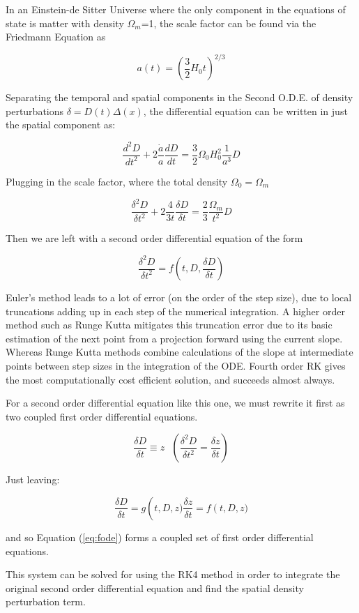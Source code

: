 


In an Einstein-de Sitter Universe where the only component in the equations of state is matter with density $\Omega_m$=1, the scale factor can be found via the Friedmann Equation as

\begin{equation}
  a(t) = \left(\frac{3}{2}H_0t\right)^{2/3}
\end{equation}

Separating the temporal and spatial components in the Second O.D.E. of density perturbations $\delta = D(t)\Delta(x)$, the differential equation can be written in just the spatial component as:

\begin{equation}
  \frac{d^2D}{dt^2}+2\frac{\dot{a}}{a}\frac{dD}{dt}=\frac{3}{2}\Omega_0H_0^2\frac{1}{a^3}D
\end{equation}

Plugging in the scale factor, where the total density $\Omega_0 = \Omega_m$

\begin{equation}
  \frac{\delta^2D}{\delta t^2}+2\frac{4}{3t}\frac{\delta D}{\delta t}=\frac{2}{3}\frac{\Omega_m}{t^2}D
\end{equation}

Then we are left with a second order differential equation of the form

\begin{equation}
  \frac{\delta^2D}{\delta t^2}=f\left(t,D,\frac{\delta D}{\delta t}\right)
\end{equation}

Euler's method leads to a lot of error (on the order of the step size),  due to local truncations adding up in each step of the numerical integration. A higher order method such as Runge Kutta mitigates this truncation error due to its basic estimation of the next point from a projection forward using the current slope. Whereas Runge Kutta methods combine calculations of the slope at intermediate points between step sizes in the integration of the ODE. Fourth order RK gives the most computationally cost efficient solution, and succeeds almost always.

For a second order differential equation like this one, we must rewrite it first as two coupled first order differential equations. 

\begin{equation}
  \frac{\delta D}{\delta t} \equiv z \text{   } \left(\frac{\delta^2D}{\delta t^2} = \frac{\delta z}{\delta t}\right)
\end{equation}

Just leaving:

\begin{equation}
  \frac{\delta D}{\delta t} = g\left(t,D,z)
  \frac{\delta z}{\delta t} = f\left(t,D,z)
  \label{eq:fode}
\end{equation}

and so Equation (\ref{eq:fode}) forms a coupled set of first order differential equations.

This system can be solved for using the RK4 method in order to integrate the original second order differential equation and find the spatial density perturbation term.